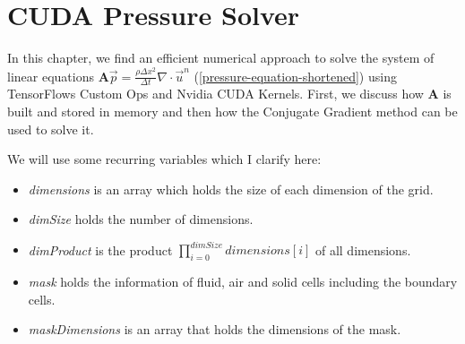 \chapter{CUDA Pressure Solver}\label{chapter:cudapressuresolver}
In this chapter, we find an efficient numerical approach to solve the system of linear equations $\mathbf{A}\vec{p} = \frac{\rho \Delta x^2}{\Delta t}\nabla \cdot \vec{u}^n$ (\ref{pressure-equation-shortened}) using TensorFlows Custom Ops and Nvidia CUDA Kernels. First, we discuss how \textbf{A} is built and stored in memory and then how the Conjugate Gradient method can be used to solve it. 
\par We will use some recurring variables which I clarify here:
\begin{itemize}
	\setlength\itemsep{-0.3em}
	\item \textit{dimensions} is an array which holds the size of each dimension of the grid.
	\item \textit{dimSize} holds the number of dimensions.
	\item \textit{dimProduct} is the product $\prod_{i=0}^{dimSize} \textit{dimensions}[i]$ of all dimensions. 
	\item \textit{mask} holds the information of fluid, air and solid cells including the boundary cells.
	\item \textit{maskDimensions} is an array that holds the dimensions of the mask.
\end{itemize}

